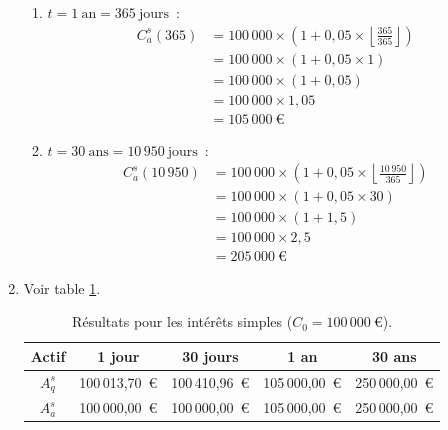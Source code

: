 \documentclass{article}
\begin{document}
\begin{enumerate}[label=\textbf{R1.\arabic*}]
\begin{enumerate}[label=(\alph*)]
	      	\item $t = 1\ \text{an} = 365\ \text{jours}$~: 
	      	      \begin{align*}
	      	      	C_a^s(365) & = 100\,000 \times \left(1 + 0,05 \times \left\lfloor \frac{365}{365} \right\rfloor \right) \\
	      	      	           & = 100\,000 \times \left(1 + 0,05 \times 1 \right)                                          \\
	      	      	           & = 100\,000 \times \left(1 + 0,05 \right)                                                   \\
	      	      	           & = 100\,000 \times 1,05                                                                     \\
	      	      	           & = \boxed{105\,000\ \text{€}}                                                             
	      	      \end{align*}
	      	              
	      	\item $t = 30\ \text{ans} = 10\,950\ \text{jours}$~: 
	      	      \begin{align*}
	      	      	C_a^s(10\,950) & = 100\,000 \times \left(1 + 0,05 \times \left\lfloor \frac{10\,950}{365} \right\rfloor \right) \\
	      	      	               & = 100\,000 \times \left(1 + 0,05 \times 30 \right)                                             \\
	      	      	               & = 100\,000 \times \left(1 + 1,5 \right)                                                        \\
	      	      	               & = 100\,000 \times 2,5                                                                          \\
	      	      	               & = \boxed{205\,000\ \text{€}}                                                                 
	      	      \end{align*}
	      \end{enumerate}
	      
	\item Voir table \ref{tab:simple_interest_results}.
	      \begin{table}[h!]
	      	\centering
	      	\begin{tabular}{|c|c|c|c|c|}
	      		\hline
	      		\textbf{Actif} & \textbf{1 jour}  & \textbf{30 jours} & \textbf{1 an}    & \textbf{30 ans}  \\
	      		\hline
	      		\( A_q^s \)    & 100\,013,70\ € & 100\,410,96\ €  & 105\,000,00\ € & 250\,000,00\ € \\
	      		\hline
	      		\( A_a^s \)    & 100\,000,00\ € & 100\,000,00\ €  & 105\,000,00\ € & 250\,000,00\ € \\
	      		\hline
	      	\end{tabular}
	      	\caption{Résultats pour les intérêts simples (\( C_0 = 100\,000\ \text{€} \)).}
	      	\label{tab:simple_interest_results}
	      \end{table}
	      

\end{enumerate}
\end{document}
